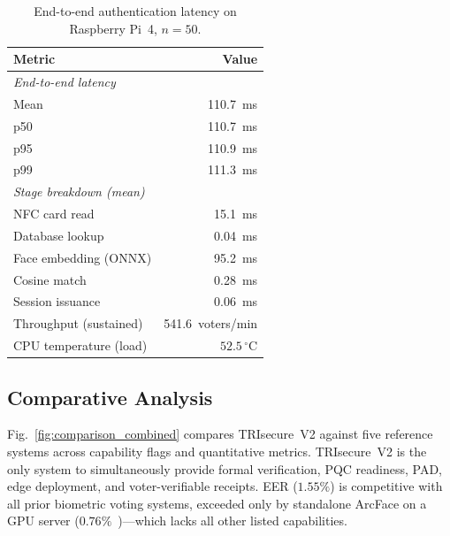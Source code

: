 \documentclass[conference]{IEEEtran}
\begin{document}
\begin{table}[t]
\centering
\caption{End-to-end authentication latency on Raspberry Pi~4, \(n{=}50\).}
\label{tab:pi}
\begin{tabular}{lr}
  \toprule
  Metric & Value \\
  \midrule
  \multicolumn{2}{l}{\textit{End-to-end latency}} \\
  \quad Mean & 110.7~ms \\
  \quad p50  & 110.7~ms \\
  \quad p95  & 110.9~ms \\
  \quad p99  & 111.3~ms \\
  \midrule
  \multicolumn{2}{l}{\textit{Stage breakdown (mean)}} \\
  \quad NFC card read        & 15.1~ms \\
  \quad Database lookup      & 0.04~ms \\
  \quad Face embedding (ONNX)& 95.2~ms \\
  \quad Cosine match         & 0.28~ms \\
  \quad Session issuance     & 0.06~ms \\
  \midrule
  Throughput (sustained) & 541.6~voters/min \\
  CPU temperature (load) & \(52.5\,^\circ\)C \\
  \bottomrule
\end{tabular}
\end{table}

\subsection{Comparative Analysis}
\label{sec:comparison}

Fig.~\ref{fig:comparison_combined} compares TRIsecure~V2 against five
reference systems across capability flags and quantitative metrics.
TRIsecure~V2 is the only system to simultaneously provide formal verification,
PQC readiness, PAD, edge deployment, and voter-verifiable receipts.
EER (\(1.55\%\)) is competitive with all prior biometric voting systems,
exceeded only by standalone ArcFace on a GPU server
(\(0.76\%\)~\cite{deng2019arcface})—which lacks all other listed capabilities.
\end{document}
